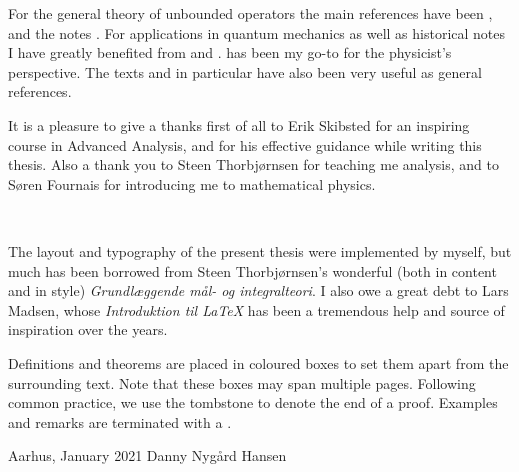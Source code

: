 \documentclass[article, a4paper, 11pt, oneside]{memoir}
\numberwithin{equation}{chapter}
\newcommand{\calE}{\mathcal{E}}
\newcommand{\fxnote}[1]{}
\theoremstyle{myexample}
\theoremstyle{myexample}
\theoremstyle{myexamplebreak}
\theoremstyle{myexamplebreak}
\theoremstyle{nonumberplain}
\theoremstyle{MyNonumberplain}
\begin{document}
For the general theory of unbounded operators the main references have been \textcite{rudinfunctional}, \textcite{schmudgen2012} and the notes \textcite{skibsted2003}. For applications in quantum mechanics as well as historical notes I have greatly benefited from \textcite{reedsimon2} and \textcite{hall2013}. \textcite{sakurai2011} has been my go-to for the physicist's perspective. The texts \textcite{rudinrealcomplex} and in particular \textcite{folland2007} have also been very useful as general references.

It is a pleasure to give a thanks first of all to Erik Skibsted for an inspiring course in Advanced Analysis, and for his effective guidance while writing this thesis. Also a thank you to Steen Thorbjørnsen for teaching me analysis, and to Søren Fournais for introducing me to mathematical physics.

~

\noindent The layout and typography of the present thesis were implemented by myself, but much has been borrowed from Steen Thorbjørnsen's wonderful (both in content and in style) \emph{Grundlæggende mål- og integralteori}. I also owe a great debt to Lars Madsen, whose \emph{Introduktion til \LaTeX} has been a tremendous help and source of inspiration over the years.

Definitions and theorems are placed in coloured boxes to set them apart from the surrounding text. Note that these boxes may span multiple pages. Following common practice, we use the tombstone \textquote{$\square$} to denote the end of a proof. Examples and remarks are terminated with a \textquote{$\lrcorner$}.

\vspace{\baselineskip}

\noindent Aarhus, January 2021 \hfill Danny Nygård Hansen


\mainmatter


\end{document}
